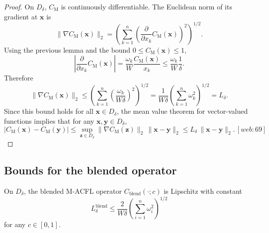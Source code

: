 \documentclass[11pt]{article}
\begin{document}
\begin{proof}
On $D_\delta$, $C_{\mathrm{M}}$ is continuously differentiable. 
The Euclidean norm of its gradient at $\mathbf{x}$ is
\[
\|\nabla C_{\mathrm{M}}(\mathbf{x})\|_2
= \left(\sum_{k=1}^n \left(\frac{\partial}{\partial x_k} C_{\mathrm{M}}(\mathbf{x})\right)^2\right)^{1/2}.
\]
Using the previous lemma and the bound $0\le C_{\mathrm{M}}(\mathbf{x})\le 1$,
\[
\left|\frac{\partial}{\partial x_k} C_{\mathrm{M}}(\mathbf{x})\right|
= \frac{\omega_k}{W} \frac{C_{\mathrm{M}}(\mathbf{x})}{x_k}
\le \frac{\omega_k}{W}\frac{1}{\delta}.
\]
Therefore
\[
\|\nabla C_{\mathrm{M}}(\mathbf{x})\|_2
\le \left(\sum_{k=1}^n \left(\frac{\omega_k}{W\delta}\right)^2\right)^{1/2}
= \frac{1}{W\delta} \left(\sum_{k=1}^n \omega_k^2\right)^{1/2}
= L_\delta.
\]
Since this bound holds for all $\mathbf{x}\in D_\delta$, the mean value theorem for vector-valued functions implies that for any $\mathbf{x},\mathbf{y}\in D_\delta$,
\[
|C_{\mathrm{M}}(\mathbf{x}) - C_{\mathrm{M}}(\mathbf{y})|
\le \sup_{\mathbf{z}\in D_\delta}\|\nabla C_{\mathrm{M}}(\mathbf{z})\|_2\,\|\mathbf{x}-\mathbf{y}\|_2
\le L_\delta \,\|\mathbf{x}-\mathbf{y}\|_2.\,[web:69]
\]
\end{proof}

\subsection{Bounds for the blended operator}

\begin{proposition}
On $D_\delta$, the blended M-ACFL operator $C_{\mathrm{blend}}(\cdot;c)$ is Lipschitz with constant
\[
L_\delta^{\mathrm{blend}} \le \frac{2}{W\delta}\left(\sum_{i=1}^n \omega_i^2\right)^{1/2}
\]
for any $c\in[0,1]$.
\end{proposition}
\end{document}
